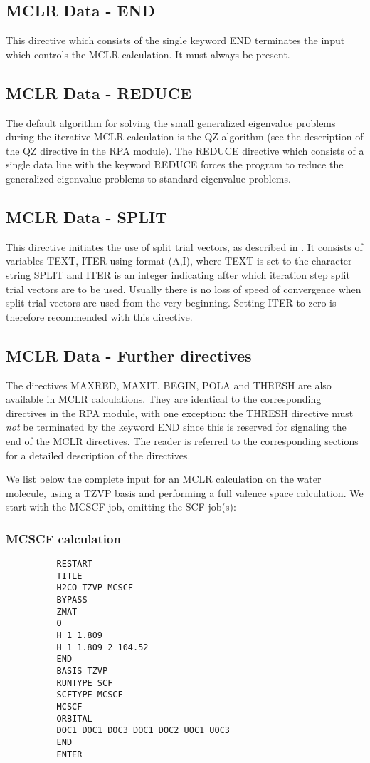 \documentclass[11pt,fleqn]{article}
\begin{document}
\subsection{MCLR Data - END}
This directive which consists of the single keyword END terminates
the input which controls the MCLR calculation. It must always be
present.
%
\subsection{MCLR Data - REDUCE}
The default algorithm for solving the small generalized eigenvalue
problems during the iterative MCLR calculation is the QZ algorithm
(see the description of the QZ directive in the RPA module).
The REDUCE directive which consists of a single data line with the
keyword REDUCE forces the program to reduce the generalized
eigenvalue problems to standard eigenvalue problems.
%
\subsection{MCLR Data - SPLIT}
This directive initiates the use of split trial vectors, as described
in \cite{ref:47}. It consists of variables TEXT, ITER using format (A,I),
where TEXT is set to the character string SPLIT and ITER is an integer
indicating after which iteration step split trial vectors are to be used.
Usually there is no loss of speed of convergence when split trial vectors
are used from the very beginning. Setting ITER to zero is therefore
recommended with this directive.
%
\subsection{MCLR Data - Further directives}
The directives MAXRED, MAXIT, BEGIN, POLA and THRESH are also 
available in MCLR calculations.
They are identical to the corresponding directives in the RPA module,
with one exception: the THRESH directive must {\em not} be terminated
by the keyword END since this is reserved for signaling the end of
the MCLR directives.
The reader is referred to the corresponding sections for a
detailed description of the directives.

We list below the complete input for an MCLR calculation on the 
water molecule, using a TZVP basis and performing a full valence 
space calculation. We start with the MCSCF job, omitting the SCF job(s):
%
\subsubsection{MCSCF calculation}
{
\footnotesize
\begin{verbatim}
          RESTART
          TITLE
          H2CO TZVP MCSCF
          BYPASS
          ZMAT
          O
          H 1 1.809 
          H 1 1.809 2 104.52 
          END
          BASIS TZVP
          RUNTYPE SCF
          SCFTYPE MCSCF
          MCSCF
          ORBITAL
          DOC1 DOC1 DOC3 DOC1 DOC2 UOC1 UOC3
          END
          ENTER
\end{verbatim}
}
%
\end{document}
